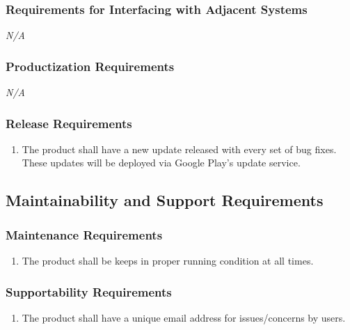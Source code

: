 \documentclass[]{article}
\newcounter{saveenum}
\newcommand{\pauseEnum}{\setcounter{saveenum}{\value{enumi}}}
\newcommand{\resumeEnum}{\setcounter{enumi}{\value{saveenum}}}
\newcommand{\NA}{\indent\indent\emph{N/A}}
\begin{document}
\subsubsection{Requirements for Interfacing with Adjacent Systems}
\label{ssub:requirements_for_interfacing_with_adjacent_systems}
	\NA

\subsubsection{Productization Requirements}
\label{ssub:productization_requirements}
	\NA

\subsubsection{Release Requirements}
\label{ssub:release_requirements}
\begin{enumerate}[{OE}1. ]
	\resumeEnum
	\item The product shall have a new update released with every set of bug fixes. These updates will be deployed via Google Play's update service. 
	\pauseEnum
\end{enumerate}


\subsection{Maintainability and Support Requirements}
\label{sub:maintainability_and_support_requirements}

\subsubsection{Maintenance Requirements}
\label{ssub:maintenance_requirements}
\begin{enumerate}[{MS}1. ]
	\item The product shall be keeps in proper running condition at all times.
	\pauseEnum
\end{enumerate}

\subsubsection{Supportability Requirements}
\label{ssub:supportability_requirements}
\begin{enumerate}[{MS}1. ]
	\resumeEnum
	\item The product shall have a unique email address for issues/concerns by users.
	\pauseEnum
\end{enumerate}
\end{document}
